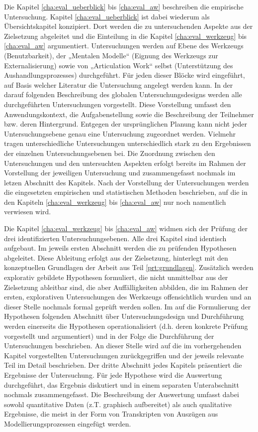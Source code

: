 Die Kapitel \ref{cha:eval_ueberblick} bis \ref{cha:eval_aw} beschreiben die empirische Untersuchung. Kapitel \ref{cha:eval_ueberblick} ist dabei wiederum als Übersichtskapitel konzipiert. Dort werden die zu untersuchenden Aspekte aus der Zielsetzung abgeleitet und die Einteilung in die Kapitel \ref{cha:eval_werkzeug} bis \ref{cha:eval_aw} argumentiert. Untersuchungen werden auf Ebene des Werkzeugs (Benutzbarkeit), der „Mentalen Modelle“ (Eignung des Werkzeugs zur Externalisierung) sowie von „Articulation Work“ selbst (Unterstützung des Aushandlungsprozesses) durchgeführt. Für jeden dieser Blöcke wird eingeführt, auf Basis welcher Literatur die Untersuchung angelegt werden kann. In der darauf folgenden Beschreibung des globalen Untersuchungsdesigns werden alle durchgeführten Untersuchungen vorgestellt. Diese Vorstellung umfasst den Anwendungskontext, die Aufgabenstellung sowie die Beschreibung der Teilnehmer bzw. deren Hintergrund. Entgegen der ursprünglichen Planung kann nicht jeder Untersuchungsebene genau eine Untersuchung zugeordnet werden. Vielmehr tragen unterschiedliche Untersuchungen unterschiedlich stark zu den Ergebnissen der einzelnen Untersuchungsebenen bei. Die Zuordnung zwischen den Untersuchungen und den untersuchten Aspekten erfolgt bereits im Rahmen der Vorstellung der jeweiligen Untersuchung und zusammengefasst nochmals im letzen Abschnitt des Kapitels. Nach der Vorstellung der Untersuchungen werden die eingesetzten empirischen und statistischen Methoden beschrieben, auf die in den Kapiteln \ref{cha:eval_werkzeug} bis \ref{cha:eval_aw} nur noch namentlich verwiesen wird.

Die Kapitel \ref{cha:eval_werkzeug} bis \ref{cha:eval_aw} widmen sich der Prüfung der drei identifizierten Untersuchungsebenen. Alle drei Kapitel sind identisch aufgebaut. Im jeweils ersten Abschnitt werden die zu prüfenden Hypothesen abgeleitet. Diese Ableitung erfolgt aus der Zielsetzung, hinterlegt mit den konzeptuellen Grundlagen der Arbeit aus Teil \ref{prt:grundlagen}. Zusätzlich werden explorativ gebildete Hypothesen formuliert, die nicht unmittelbar aus der Zielsetzung ableitbar sind, die aber Auffälligkeiten abbilden, die im Rahmen der ersten, explorativen Untersuchungen des Werkzeugs offensichtlich wurden und an dieser Stelle nochmals formal geprüft werden sollen. Im auf die Formulierung der Hypothesen folgenden Abschnitt über Untersuchungsdesign und Durchführung werden einerseits die Hypothesen operationalisiert (d.h. deren konkrete Prüfung vorgestellt und argumentiert) und in der Folge die Durchführung der Untersuchungen beschrieben. An dieser Stelle wird auf die im vorhergehenden Kapitel vorgestellten Untersuchungen zurückgegriffen und der jeweils relevante Teil im Detail beschrieben. Der dritte Abschnitt jedes Kapitels präsentiert die Ergebnisse der Untersuchung. Für jede Hypothese wird die Auswertung durchgeführt, das Ergebnis diskutiert und in einem separaten Unterabschnitt nochmals zusammengefasst. Die Beschreibung der Auswertung umfasst dabei sowohl quantitative Daten (z.T. graphisch aufbereitet) als auch qualitative Ergebnisse, die meist in der Form von Transkripten von Auszügen aus Modellierungsprozessen eingefügt werden.

